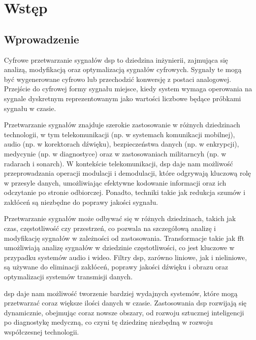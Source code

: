 \chapter*{Wstęp}
\label{cha:wstęp}

\section*{Wprowadzenie}
\label{sec:wprowadzenie}

Cyfrowe przetwarzanie sygnałów \ac{dsp} to dziedzina inżynierii, zajmująca się analizą, modyfikacją oraz optymalizacją sygnałów cyfrowych. Sygnały te mogą być wygenerowane cyfrowo lub przechodzić konwersję z postaci analogowej.
Przejście do cyfrowej formy sygnału miejsce, kiedy system wymaga operowania na sygnale dyskretnym reprezentowanym jako wartości liczbowe będące próbkami sygnału w czasie.

Przetwarzanie sygnałów znajduje szerokie zastosowanie w różnych dziedzinach technologii, w tym telekomunikacji (np. w systemach komunikacji mobilnej), audio (np. w korektorach dźwięku), bezpieczeństwa danych (np. w enkrypcji), medycynie (np. w diagnostyce) oraz w zastosowaniach militarncyh (np. w radarach i sonarch).
W kontekście telekomunikacji, \ac{dsp} daje nam możliwość przeprowadzania operacji modulacji i demodulacji, które odgrywają kluczową rolę w przesyle danych, umożliwiając efektywne kodowanie informacji oraz ich odczytanie po stronie odbiorczej. Ponadto, techniki takie jak redukcja szumów i zakłóceń są niezbędne do poprawy jakości sygnału.

Przetwarzanie sygnałów może odbywać się w różnych dziedzinach, takich jak czas, częstotliwość czy przestrzeń, co pozwala na szczegółową analizę i modyfikację sygnałów w zależności od zastosowania.
Transformacje takie jak \ac{fft} umożliwiają analizę sygnałów w dziedzinie częstotliwości, co jest kluczowe w przypadku systemów audio i wideo. Filtry \ac{dsp}, zarówno liniowe, jak i nieliniowe,
są używane do eliminacji zakłóceń, poprawy jakości dźwięku i obrazu oraz optymalizacji systemów transmisji danych.

\ac{dsp} daje nam możliwość tworzenie bardziej wydajnych systemów, które mogą przetwarzać coraz większe ilości danych w czasie. Zastosowania \ac{dsp} rozwijają się dynamicznie, obejmując coraz nowsze obszary,
od rozwoju sztucznej inteligencji po diagnostykę medyczną, co czyni tę dziedzinę niezbędną w rozwoju współczesnej technologii.

